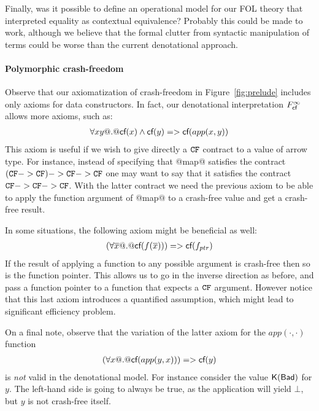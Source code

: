 Finally, was it possible to define an operational model for our FOL theory that interpreted
equality as contextual equivalence? Probably this could be made to work, although we believe
that the formal clutter from syntactic manipulation of terms could be worse than the current
denotational approach. 


\paragraph{Polymorphic crash-freedom}

Observe that our axiomatization of crash-freedom in Figure~\ref{fig:prelude} 
includes only axioms for data constructors. In fact, our denotational interpretation
$F_{\textsf{cf}}^{\infty}$ allows more axioms, such as:
\[\begin{array}{l}
    \forall x y @.@ \textsf{cf}(x) \land \textsf{cf}(y) => \textsf{cf}(app(x,y))
\end{array}\] 
This axiom is useful if we wish to give directly a ${\tt CF}$ contract to a value of 
arrow type. For instance, instead of specifying that @map@ satisfies the contract
$({\tt CF} -> {\tt CF}) -> {\tt CF} -> {\tt CF}$ one may want to say that it satisfies the contract
${\tt CF} -> {\tt CF} -> {\tt CF}$. With the latter contract we need the previous axiom to be 
able to apply the function argument of @map@ to a crash-free value and get a 
crash-free result. 

In some situations, the following axiom might be beneficial as well:
\[\begin{array}{l}
    (\forall \overline{x} @.@ \textsf{cf}(f(\overline{x}))) => \textsf{cf}(f_{ptr})
\end{array}\]
If the result of applying a function to any possible argument is crash-free then 
so is the function pointer. This allows us to go in the inverse direction as before, 
and pass a function pointer to a function that expects a ${\tt CF}$ argument. However notice
that this last axiom introduces a quantified assumption, which might lead to significant
efficiency problem.

On a final note, observe that the variation of the latter axiom for the 
$app(\cdot,\cdot)$ function
\[\begin{array}{l}
   (\forall x @.@ \textsf{cf}(app(y,x))) => \textsf{cf}(y)
\end{array}\]
is {\em not} valid in the denotational model. For instance consider the
value $\mathsf{K}(\mathsf{Bad})$ for $y$. The left-hand side is going to always 
be true, as the application will yield $\bot$, but $y$ is not crash-free 
itself.


